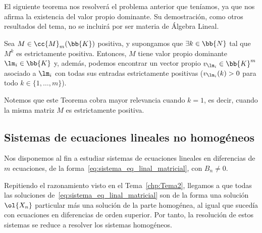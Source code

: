 El siguiente teorema nos resolverá el problema anterior que teníamos, ya que nos afirma la existencia del valor propio dominante. Su demostración, como otros resultados del tema, no se incluirá por ser materia de Álgebra Lineal.
\begin{teo}
    Sea $M\in \cc{M}_m(\bb{K})$ positiva, y supongamos que $\exists k\in \bb{N}$ tal que $M^k$ es estrictamente positiva. Entonces, $M$ tiene valor propio dominante $\lm_i\in \bb{K}$ y, además, podemos encontrar un vector propio $v_{\lm_i}\in \bb{K}^m$ asociado a $\lm_i$ con todas sus entradas estrictamente positivas ($v_{\lm_i}(k)>0$ para todo $k\in \{1,\dots,m\}$).
\end{teo}
Notemos que este Teorema cobra mayor relevancia cuando $k=1$, es decir, cuando la misma matriz $M$ es estrictamente positiva.























\subsection{Sistemas de ecuaciones lineales no homogéneos}
Nos disponemos al fin a estudiar sistemas de ecuaciones lineales en diferencias de $m$ ecuaciones, de la forma~\ref{eq:sistema_eq_linal_matricial}, con $B_n\neq 0$.

Repitiendo el razonamiento visto en el Tema~\ref{chp:Tema2}, llegamos a que todas las soluciones de~\ref{eq:sistema_eq_linal_matricial} son de la forma una solución $\ol{X_n}$ particular más una solución de la parte homogénea, al igual que sucedía con ecuaciones en diferencias de orden superior. Por tanto, la resolución de estos sistemas se reduce a resolver los sistemas homogéneos.


